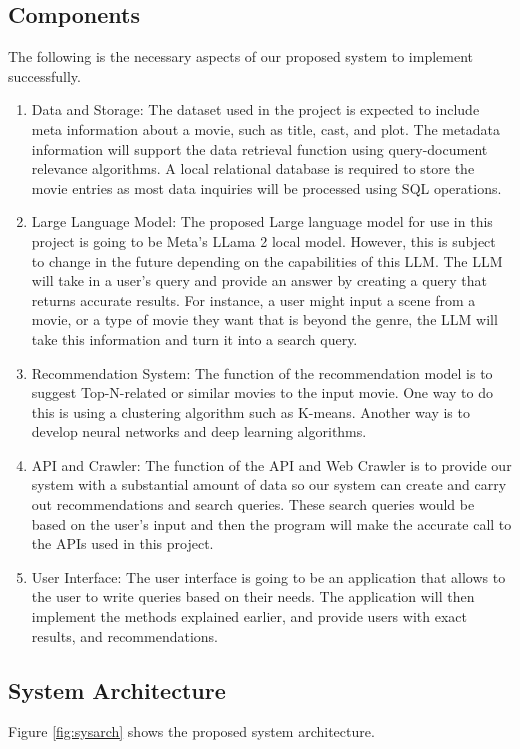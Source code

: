 \documentclass[journal]{IEEEtran}
\begin{document}
\subsection{Components}
The following is the necessary aspects of our proposed system to implement successfully.
\begin{enumerate}
    \item {Data and Storage}: The dataset used in the project is expected to include meta information about a movie, such as title, cast, and plot. The metadata information will support the data retrieval function using query-document relevance algorithms. A local relational database is required to store the movie entries as most data inquiries will be processed using SQL operations. 

    \item {Large Language Model}: The proposed Large language model for use in this project is going to be Meta’s LLama 2 local model. However, this is subject to change in the future depending on the capabilities of this LLM. The LLM will take in a user’s query and provide an answer by creating a query that returns accurate results. For instance, a user might input a scene from a movie, or a type of movie they want that is beyond the genre, the LLM will take this information and turn it into a search query.

    \item {Recommendation System}: The function of the recommendation model is to suggest Top-N-related or similar movies to the input movie. One way to do this is using a clustering algorithm such as K-means. Another way is to develop neural networks and deep learning algorithms.

    \item {API and Crawler}: The function of the API and Web Crawler is to provide our system with a substantial amount of data so our system can create and carry out recommendations and search queries. These search queries would be based on the user’s input and then the program will make the accurate call to the APIs used in this project.

    \item {User Interface}: The user interface is going to be an application that allows to the user to write queries based on their needs. The application will then implement the methods explained earlier, and provide users with exact results, and recommendations. 
\end{enumerate}

\subsection{System Architecture}
Figure \ref{fig:sysarch} shows the proposed system architecture.
\end{document}
